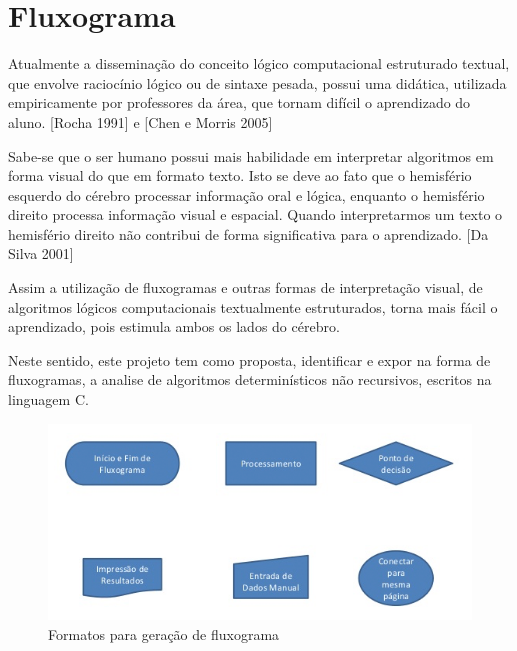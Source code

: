 \chapter{Fluxograma} \label{fluxograma}
\par Atualmente a disseminação do conceito lógico computacional estruturado textual, que envolve raciocínio lógico ou de sintaxe pesada, possui uma didática, utilizada empiricamente por professores da área, que tornam difícil o aprendizado do aluno. [Rocha 1991] e [Chen e Morris 2005]
\par Sabe-se que o ser humano possui mais habilidade em interpretar algoritmos em forma visual do que em formato texto. Isto se deve ao fato que o hemisfério esquerdo do cérebro processar informação oral e lógica, enquanto o hemisfério direito processa informação visual e espacial. Quando interpretarmos um texto o hemisfério direito não contribui de forma significativa para o aprendizado. [Da Silva 2001]
\par Assim a utilização de fluxogramas e outras formas de interpretação visual, de algoritmos lógicos computacionais textualmente estruturados, torna mais fácil o aprendizado, pois estimula ambos os lados do cérebro.
\par Neste sentido, este projeto tem como proposta, identificar e expor na forma de fluxogramas, a analise de algoritmos determinísticos não recursivos, escritos na linguagem C.

\begin{figure}[htp!]
\centering
\includegraphics[width=\textwidth]{figuras/fluxograma2.png}
\caption{Formatos para geração de fluxograma}
\label{figura1}
\end{figure}

